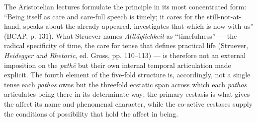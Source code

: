\documentclass{article}
\begin{document}
The Aristotelian lectures formulate the principle in its most concentrated form: ``Being itself as care and care-full speech is timely; it cares for the still-not-at-hand, speaks about the already-appeared, investigates that which is now with us'' (BCAP, p. 131). What Struever names \textit{Alltäglichkeit} as ``timefulness'' --- the radical specificity of time, the care for tense that defines practical life (Struever, \textit{Heidegger and Rhetoric}, ed. Gross, pp. 110--113) --- is therefore not an external imposition on the \textit{pathē} but their own internal temporal articulation made explicit. The fourth element of the five-fold structure is, accordingly, not a single tense each \textit{pathos} owns but the threefold ecstatic span across which each \textit{pathos} articulates being-there in its determinate way; the primary ecstasis is what gives the affect its name and phenomenal character, while the co-active ecstases supply the conditions of possibility that hold the affect in being.
\end{document}

